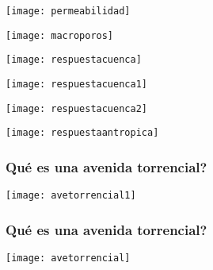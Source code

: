 \documentclass{beamer}
\begin{document}
\begin{frame}
\begin{center}
   	\texttt{[image: permeabilidad]}
\end{center}
\end{frame}
\begin{frame}
\begin{center}
   	\texttt{[image: macroporos]}
\end{center}
\end{frame}
\begin{frame}
\begin{center}
   	\texttt{[image: respuestacuenca]}
\end{center}
\end{frame}
\begin{frame}
\begin{center}
   	\texttt{[image: respuestacuenca1]}
\end{center}
\end{frame}
\begin{frame}
\begin{center}
   	\texttt{[image: respuestacuenca2]}
\end{center}
\end{frame}
\begin{frame}
\begin{center}
   	\texttt{[image: respuestaantropica]}
\end{center}
\end{frame}
\begin{frame}
\frametitle{Qué es una avenida torrencial?}
\begin{center}
   	\texttt{[image: avetorrencial1]}
\end{center}
\end{frame}
\begin{frame}
\frametitle{Qué es una avenida torrencial?}
\begin{center}
   	\texttt{[image: avetorrencial]}
\end{center}
\end{frame}
\end{document}

